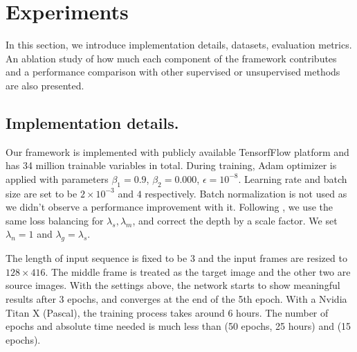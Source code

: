 \vspace{-0.7\baselineskip}
\section{Experiments}
\label{sec:experiments}
\vspace{-0.3\baselineskip}

In this section, we introduce implementation details, datasets, evaluation metrics. An ablation study of how much each component of the framework contributes and a performance comparison with other supervised or unsupervised methods are also presented.

\vspace{-0.3\baselineskip}
\subsection{Implementation details.}
\vspace{-0.1\baselineskip}
Our framework is implemented with publicly available TensorfFlow \cite{abadi2016tensorflow} platform and has 34 million trainable variables in total. During training, Adam optimizer is applied with parameters $\beta_1 = 0.9$, $\beta_2=0.000$, $\epsilon=10^{-8}$. Learning rate and batch size are set to be $2\times10^{-3}$ and $4$ respectively. Batch normalization \cite{ioffe2015batch} is not used as we didn't observe a performance improvement with it. Following \cite{zhou2017unsupervised}, we use the same loss balancing for $\lambda_s, \lambda_m$, and correct the depth by a scale factor. We set $\lambda_n=1$ and $\lambda_g=\lambda_s$. %

The length of input sequence is fixed to be 3 and the input frames are resized to $128 \times 416$. The middle frame is treated as the target image and the other two are source images. With the settings above, the network starts to show meaningful results after 3 epochs, and converges at the end of the 5th epoch. With a Nvidia Titan X (Pascal), the training process takes around 6 hours. The number of epochs and absolute time needed is much less than \cite{godard2016unsupervised} (50 epochs, 25 hours) and \cite{zhou2017unsupervised} (15 epochs).


